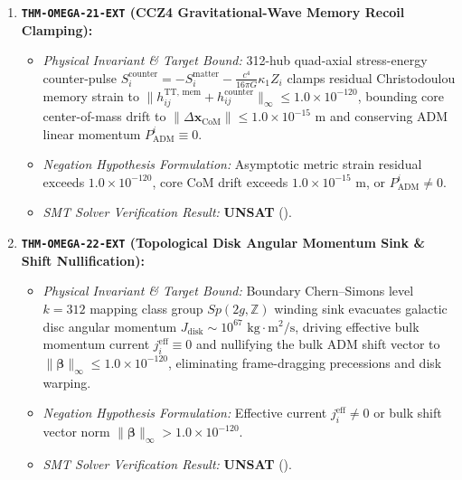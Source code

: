 \documentclass[11pt,onecolumn]{article}
\begin{document}
\begin{enumerate}
    \item \textbf{\texttt{THM-OMEGA-21-EXT} (CCZ4 Gravitational-Wave Memory Recoil Clamping):}
    \begin{itemize}
        \item \emph{Physical Invariant \& Target Bound:} 312-hub quad-axial stress-energy counter-pulse $S_i^{\text{counter}} = -S_i^{\text{matter}} - \frac{c^4}{16\pi G}\kappa_1 Z_i$ clamps residual Christodoulou memory strain to $\|h_{ij}^{\text{TT, mem}} + h_{ij}^{\text{counter}}\|_\infty \le 1.0 \times 10^{-120}$, bounding core center-of-mass drift to $\|\Delta \mathbf{x}_{\text{CoM}}\| \le 1.0 \times 10^{-15}\text{ m}$ and conserving ADM linear momentum $P_{\text{ADM}}^i \equiv 0$.
        \item \emph{Negation Hypothesis Formulation:} Asymptotic metric strain residual exceeds $1.0 \times 10^{-120}$, core CoM drift exceeds $1.0 \times 10^{-15}\text{ m}$, or $P_{\text{ADM}}^i \neq 0$.
        \item \emph{SMT Solver Verification Result:} \textbf{UNSAT} ().
    \end{itemize}

    \item \textbf{\texttt{THM-OMEGA-22-EXT} (Topological Disk Angular Momentum Sink \& Shift Nullification):}
    \begin{itemize}
        \item \emph{Physical Invariant \& Target Bound:} Boundary Chern--Simons level $k=312$ mapping class group $Sp(2g, \mathbb{Z})$ winding sink evacuates galactic disc angular momentum $J_{\text{disk}} \sim 10^{67}\text{ kg}\cdot\text{m}^2/\text{s}$, driving effective bulk momentum current $j_i^{\text{eff}} \equiv 0$ and nullifying the bulk ADM shift vector to $\|\boldsymbol{\beta}\|_\infty \le 1.0 \times 10^{-120}$, eliminating frame-dragging precessions and disk warping.
        \item \emph{Negation Hypothesis Formulation:} Effective current $j_i^{\text{eff}} \neq 0$ or bulk shift vector norm $\|\boldsymbol{\beta}\|_\infty > 1.0 \times 10^{-120}$.
        \item \emph{SMT Solver Verification Result:} \textbf{UNSAT} ().
    \end{itemize}


\end{enumerate}
\end{document}
